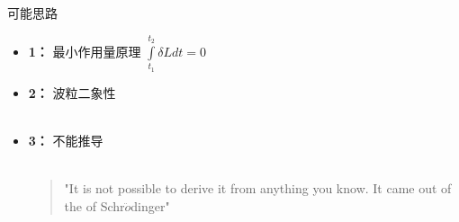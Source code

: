 \begin{frame}
	\begin{alertblock} {可能思路}  
		\begin{itemize}
			\item 	\textbf{1：}  最小作用量原理 $\int\limits_{t_1}^{t_2} \delta L d t =0 $\\ 
			\item 	\textbf{2：}  波粒二象性\\ 
			~\\ 
			\item 	\textbf{3：}  不能推导\\
            ~\\ 
            \begin{quote}
            "It is not possible to derive it from anything you know. It came out of the \alert{\faHeartbeat} of Schr$\ddot{o}$dinger"\\
            \end{quote}
		\end{itemize}
	\end{alertblock}
\end{frame}

